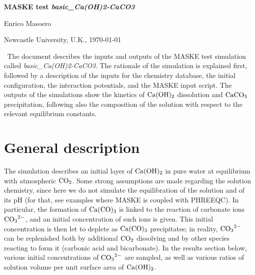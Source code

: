 \documentclass[12pt]{paper}    %
\newcommand{\no}{\noindent}
\begin{document}
\pagestyle{plain}

\baselineskip 26pt


\begin{center}

{\Large {\bf MASKE test \textit{basic\_Ca(OH)2-CaCO3}}}

\vskip 2mm

{\Large Enrico Masoero}

Newcastle University, U.K., \today

\end{center}

\baselineskip 16pt

\vskip 2mm
\no {\bf   Abstract}\, {\small The document describes the inputs and outputs of the MASKE test simulation called \textit{basic\_Ca(OH)2-CaCO3}. The rationale of the simulation is explained first, followed by a description of the inputs for the chemistry database, the initial configuration, the interaction potentials, and the MASKE input script. The outputs of the simulations show the kinetics of $\ce{Ca(OH)_2}$ dissolution and $\ce{CaCO_3}$ precipitation, following also the composition of the solution with respect to the relevant equilibrium constants.}


\tableofcontents





\section{General description} 

The simulation describes an initial layer of $\ce{Ca(OH)_2}$ in pure water at equilibrium with atmospheric $\ce{CO_2}$. Some strong assumptions are made regarding the solution chemistry, since here we do not simulate the equilibration of the solution and of its pH (for that, see examples where MASKE is coupled with PHREEQC). In particular, the formation of $\ce{Ca(CO)_3}$ is linked to the reaction of carbonate ions $\ce{CO_3^{2-}}$, and an initial concentration of such ions is given. This initial concentration is then let to deplete as $\ce{Ca(CO)_3}$ precipitates; in reality, $\ce{CO_3^{2-}}$ can be replenished both by additional $\ce{CO_2}$ dissolving and by other species reacting to form it (carbonic acid and bicarbonate). In the results section below, various initial concentrations of $\ce{CO_3^{2-}}$ are sampled, as well as various ratios of solution volume per unit surface area of $\ce{Ca(OH)_2}$.
\end{document}
